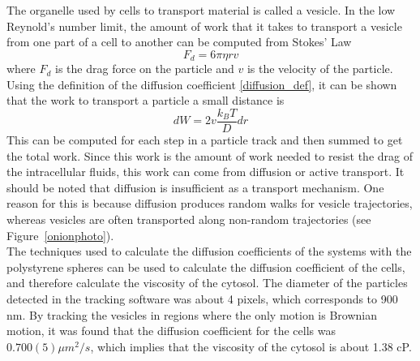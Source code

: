 \documentclass[11pt,letterpaper]{article}
\begin{document}
The organelle used by cells to transport material is called a vesicle. In the
low Reynold's number limit, the amount of work that it takes to transport a
vesicle from one part of a cell to another can be computed from Stokes' Law
\cite{StokesLawWiki}
\begin{equation}
    F_d = 6\pi \eta r v
\end{equation}
where $F_d$ is the drag force on the particle and $v$ is the velocity of the
particle. Using the definition of the diffusion coefficient
\eqref{diffusion_def}, it can be shown that the work to transport a particle a
small distance is
\begin{equation}
    dW = 2v \frac{k_B T}{D}dr
\end{equation}
This can be computed for each step in a particle track and then summed to get
the total work. Since this work is the amount of work needed to resist the drag
of the intracellular fluids, this work can come from diffusion or active
transport. It should be noted that diffusion is insufficient as a transport
mechanism. One reason for this is because diffusion produces random walks for
vesicle trajectories, whereas vesicles are often transported along non-random
trajectories (see Figure~\ref{onionphoto}).\\

The techniques used to calculate the diffusion coefficients of the systems with
the polystyrene spheres can be used to calculate the diffusion coefficient of
the cells, and therefore calculate the viscosity of the cytosol. The diameter of
the particles detected in the tracking software was about 4 pixels, which
corresponds to 900 nm. By tracking the vesicles in regions where the only motion
is Brownian motion, it was found that the diffusion coefficient for the cells
was $0.700(5) \mu m^2 / s$, which implies that the viscosity of the cytosol is
about 1.38 cP.\\
\end{document}
